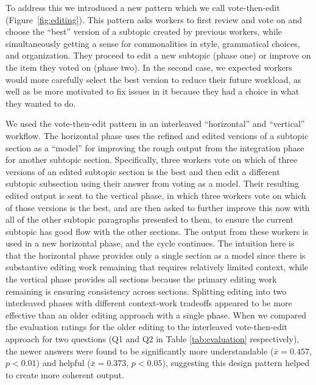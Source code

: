 
To address this we introduced a new pattern which we call vote-then-edit (Figure~\ref{fig:editing}). This pattern asks workers to first review and vote on and choose the ``best'' version of a subtopic created by previous workers, while simultaneously getting a sense for commonalities in style, grammatical choices, and organization. They proceed to edit a new subtopic (phase one) or improve on the item they voted on (phase two). In the second case, we expected workers would more carefully select the best version to reduce their future workload, as well as be more motivated to fix issues in it because they had a choice in what they wanted to do. 

We used the vote-then-edit pattern in an interleaved ``horizontal'' and ``vertical'' workflow. The horizontal phase uses the refined and edited versions of a subtopic section as a ``model'' for improving the rough output from the integration phase for another subtopic section. Specifically, three workers vote on which of three versions of an edited subtopic section is the best and then edit a different subtopic subsection using their answer from voting as a model. Their resulting edited output is sent to the vertical phase, in which three workers vote on which of those versions is the best, and are then asked to further improve this now with all of the other subtopic paragraphs presented to them, to ensure the current subtopic has good flow with the other sections. The output from these workers is used in a new horizontal phase, and the cycle continues.  The intuition here is that the horizontal phase provides only a single section as a model since there is substantive editing work remaining that requires relatively limited context, while the vertical phase provides all sections because the primary editing work remaining is ensuring consistency across sections. Splitting editing into two interleaved phases with different context-work tradeoffs appeared to be more effective than an older editing approach with a single phase. When we compared the evaluation ratings for the older editing to the interleaved vote-then-edit approach for two questions (Q1 and Q2 in Table \ref{tab:evaluation} respectively), the newer answers were found to be significantly more understandable ($\bar{x} = 0.457$, $p < 0.01$) and helpful ($\bar{x} = 0.373$, $p < 0.05$), suggesting this design pattern helped to create more coherent output.


